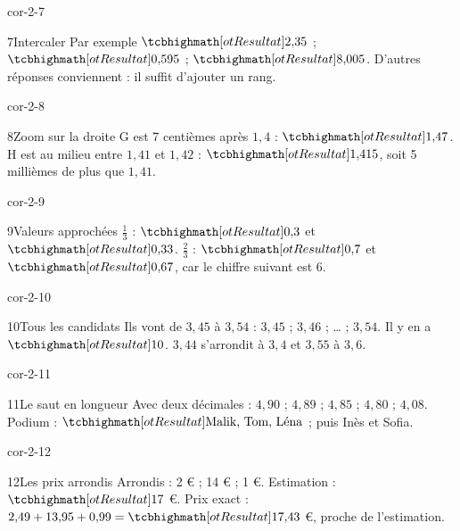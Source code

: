 \begin{blocLivre}{cor-2-7}\begin{corrige}{7}{Intercaler}
Par exemple $\res{2{,}35}$ ; $\res{0{,}595}$ ; $\res{8{,}005}$. D’autres réponses conviennent : il suffit d’ajouter un rang.
\end{corrige}\end{blocLivre}
\begin{blocLivre}{cor-2-8}\begin{corrige}{8}{Zoom sur la droite}
G est 7 centièmes après $1{,}4$ : $\res{1{,}47}$. H est au milieu entre $1{,}41$ et $1{,}42$ : $\res{1{,}415}$, soit 5 millièmes de plus que $1{,}41$.
\label{fig-cor-2-8}
\end{corrige}\end{blocLivre}
\begin{blocLivre}{cor-2-9}\begin{corrige}{9}{Valeurs approchées}
$\frac13$ : $\res{0{,}3}$ et $\res{0{,}33}$. $\frac23$ : $\res{0{,}7}$ et $\res{0{,}67}$, car le chiffre suivant est 6.
\end{corrige}\end{blocLivre}
\begin{blocLivre}{cor-2-10}\begin{corrige}{10}{Tous les candidats}
Ils vont de $3{,}45$ à $3{,}54$ : $3{,}45$ ; $3{,}46$ ; … ; $3{,}54$. Il y en a $\res{10}$. $3{,}44$ s’arrondit à $3{,}4$ et $3{,}55$ à $3{,}6$.
\end{corrige}\end{blocLivre}
\begin{blocLivre}{cor-2-11}\begin{corrige}{11}{Le saut en longueur}
Avec deux décimales : $4{,}90$ ; $4{,}89$ ; $4{,}85$ ; $4{,}80$ ; $4{,}08$. Podium : $\res{\text{Malik, Tom, Léna}}$ ; puis Inès et Sofia.
\end{corrige}\end{blocLivre}
\begin{blocLivre}{cor-2-12}\begin{corrige}{12}{Les prix arrondis}
Arrondis : 2 € ; 14 € ; 1 €. Estimation : $\res{17}$ €. Prix exact : $2{,}49+13{,}95+0{,}99=\res{17{,}43}$ €, proche de l’estimation.
\end{corrige}\end{blocLivre}
